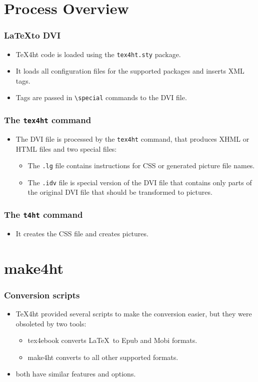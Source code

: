 \documentclass{beamer}
\begin{document}
  \section{Process Overview}
  \begin{frame}[fragile]
   \frametitle{\LaTeX to DVI}
    \begin{itemize}
      \item \TeX4ht code is loaded using the \verb|tex4ht.sty| package. 
      \item It loads all configuration files
        for the supported packages and inserts XML tags. 
      \item Tags are passed in \verb|\special| commands to the DVI file.
    \end{itemize}
  \end{frame}
  \begin{frame}[fragile]
   \frametitle{The \texttt{tex4ht} command}
    \begin{itemize}
      \item The DVI file is processed by the \verb|tex4ht| command, that produces XHML or HTML files and 
        two special files:
        \begin{itemize}
      \item The \verb|.lg| file contains instructions for CSS or generated picture file names.
      \item The \verb|.idv| file is special version of the DVI file that contains only parts of the original DVI file 
        that should be transformed to pictures.
    \end{itemize}
    \end{itemize}
  \end{frame}
  \begin{frame}[fragile]
    \frametitle{The \texttt{t4ht} command}
   \begin{itemize}
     \item It creates the CSS file and creates pictures.
   \end{itemize}
  \end{frame}
  \section{make4ht}
  \begin{frame}
    \frametitle{Conversion scripts}
    \begin{itemize}
      \item \TeX4ht provided several scripts to make the conversion easier, but they were obsoleted by two tools:
        \begin{itemize}
      \item tex4ebook converts \LaTeX\ to Epub and Mobi formats.
      \item make4ht converts to all other supported formats.
    \end{itemize}
  \item both have similar features and options.

    \end{itemize}
  \end{frame}
\end{document}
